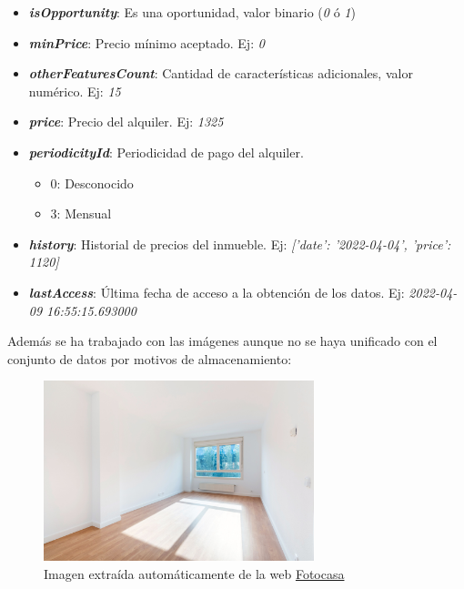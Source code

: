 \begin{itemize}
	\item \textit{\textbf{isOpportunity}}: Es una oportunidad, valor binario (\textit{0} ó \textit{1})

	\item \textit{\textbf{minPrice}}: Precio mínimo aceptado. Ej: \textit{0}

	\item \textit{\textbf{otherFeaturesCount}}: Cantidad de características adicionales, valor numérico. Ej: \textit{15}

	\item \textit{\textbf{price}}: Precio del alquiler. Ej: \textit{1325}

	\item \textit{\textbf{periodicityId}}: Periodicidad de pago del alquiler.
	\begin{itemize}
            \item 0: Desconocido
            \item 3: Mensual
      \end{itemize}
	\item \textit{\textbf{history}}: Historial de precios del inmueble. Ej: \textit{[{'date': '2022-04-04', 'price': 1120}]}

	\item \textit{\textbf{lastAccess}}: Última fecha de acceso a la obtención de los datos. Ej: \textit{2022-04-09 16:55:15.693000}

\end{itemize}


Además se ha trabajado con las imágenes aunque no se haya unificado con el conjunto de datos por motivos de almacenamiento:

\begin{figure}[H]
      \centering
      \includegraphics[width=0.7\textwidth]{images/downloaded examples/fc-162706645-466660935.jpg}
      \caption{Imagen extraída automáticamente de la web \href{https://www.fotocasa.es/es/}{Fotocasa}}
\end{figure}

